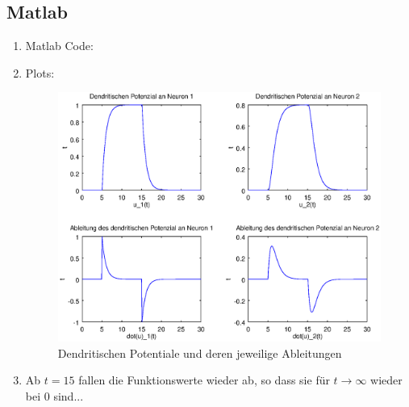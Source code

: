 \documentclass[DIN, pagenumber=false, fontsize=11pt, parskip=half]{scrartcl}
\begin{document}
    \subsection{Matlab}
    \begin{enumerate}[label=(\alph*)]
        \item Matlab Code:
            
        
        \item Plots:
            \begin{figure}[H]
                \centering
                \includegraphics[trim = 0 0 10 10,width=\textwidth]{Plot}
                \caption{Dendritischen Potentiale und deren jeweilige Ableitungen}
            \end{figure} 

        \item Ab $t=15$ fallen die Funktionswerte wieder ab, so dass sie für $t \to \infty$ wieder bei $0$ sind...%
    \end{enumerate}
\end{document}
